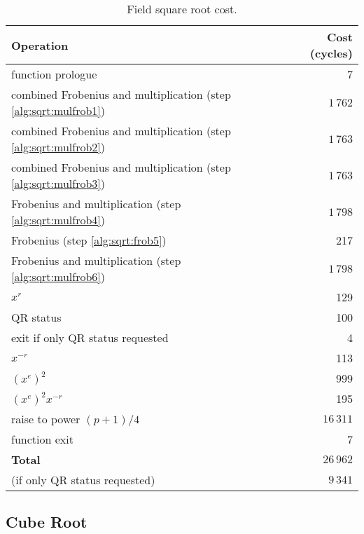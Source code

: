 \documentclass{llncs}
\begin{document}
\begin{table}[H]
\begin{center}
    \begin{tabular}{|l|r|}
    \hline
    \textsf{\textbf{Operation}} & \textsf{\textbf{Cost (cycles)}} \\
    \hline
    function prologue                          &        7 \\
    combined Frobenius and multiplication (step \ref{alg:sqrt:mulfrob1})  & $1\,762$ \\
    combined Frobenius and multiplication (step \ref{alg:sqrt:mulfrob2})  & $1\,763$ \\
    combined Frobenius and multiplication (step \ref{alg:sqrt:mulfrob3})  & $1\,763$ \\
    Frobenius and multiplication (step \ref{alg:sqrt:mulfrob4})           & $1\,798$ \\
    Frobenius (step \ref{alg:sqrt:frob5})      & 217 \\
    Frobenius and multiplication (step \ref{alg:sqrt:mulfrob6})           & $1\,798$ \\
    $x^r$                                      & 129 \\
    QR status                                  & 100 \\
    exit if only QR status requested           &   4 \\
    $x^{-r}$                                   & 113 \\
    $(x^e)^2$                                  & 999 \\
    $(x^e)^2 x^{-r}$                           & 195 \\
    raise to power $(p+1)/4$                   & $16\,311$ \\
    function exit                              &   7 \\
    \hline
    \textsf{\textbf{Total}}                    & $26\,962$ \\
    (if only QR status requested)              & $9\,341$ \\
    \hline
    \end{tabular}
\end{center}
\caption{\label{tab:fieldsqrt}Field square root cost.}
\end{table}

\subsection{Cube Root}\label{sec:field-ops-cubert}
\end{document}
